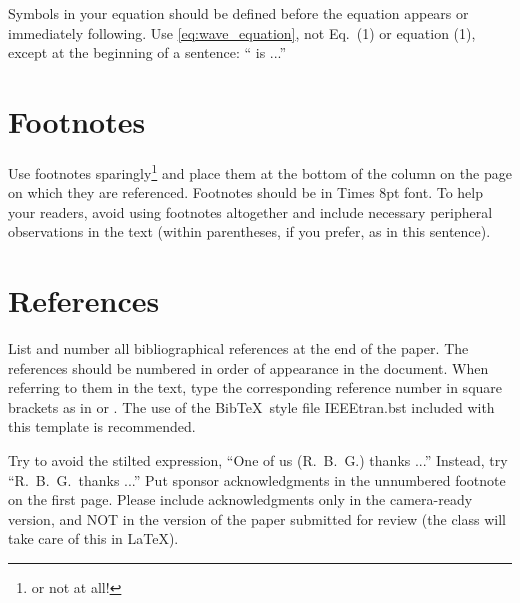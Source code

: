 \documentclass[9pt]{ieeeconf}
\begin{document}
Symbols in your equation should be defined before the equation appears or immediately following.  Use \cref{eq:wave_equation}, not Eq.~(1) or equation (1), except at the beginning of a sentence: `` is ...''


\section{Footnotes}
\label{sec:foot}

Use footnotes sparingly\footnote{or not at all!} and place them at the bottom of
the column on the page on which they are referenced. Footnotes should be in
Times 8pt font. To help your readers, avoid using footnotes altogether and
include necessary peripheral observations in the text (within parentheses, if
you prefer, as in this sentence).


\section{References}
\label{sec:ref}

List and number all bibliographical references at the end of the paper. The
references should be numbered in order of appearance in the document. When
referring to them in the text, type the corresponding reference number in square
brackets as in \cite{cJones2026,aSmith2026} or
\cite{eWilliams1999,cJones2026,aSmith2026}. The use of the Bib\TeX\ style file
IEEEtran.bst included with this template is recommended.


\begin{acknowledgments}
Try to avoid the stilted expression, ``One of us (R.\ B.\ G.) thanks ...''
Instead, try ``R.\ B.\ G.\ thanks ...'' Put sponsor acknowledgments in the
unnumbered footnote on the first page. Please include acknowledgments only in
the camera-ready version, and NOT in the version of the paper submitted for
review (the class will take care of this in \LaTeX).
\end{acknowledgments}




\end{document}
